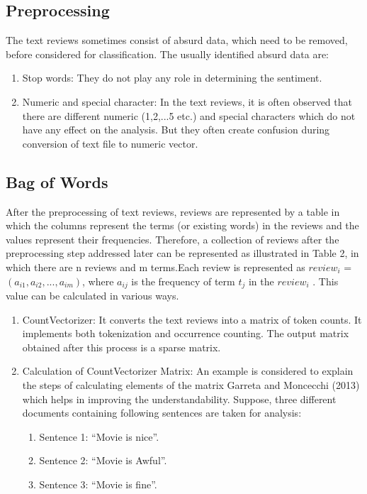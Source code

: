 \documentclass[10pt]{article}
\begin{document}
{\subsection{Preprocessing}
The text reviews sometimes consist of absurd data, which
need to be removed, before considered for classification.
The usually identified absurd data are:
\begin{enumerate}
 \item Stop words: They do not play any role in determining
the sentiment.
  \item Numeric and special character: In the text reviews, it is
often observed that there are different numeric (1,2,...5
etc.) and special characters %
which do not have any effect on the analysis. But they
often create confusion during conversion of text file to
numeric vector.
\end{enumerate}

\subsection{Bag of Words}
After the preprocessing of text reviews, reviews are represented by a table in which the columns
represent the terms (or existing words) in the reviews and the values
represent their frequencies. Therefore, a collection of reviews after
the preprocessing step addressed later can be represented as illustrated in 
Table 2, in which there are n reviews and m terms.Each
review is represented as $review_i$ = $(a_{i1} , a_{i2} ,...,a_{im} )$, where $a_{ij}$ is the 
frequency of term $t_j$ in the $review_i$ . This value can be calculated in various
ways.
\begin{enumerate}
 \item CountVectorizer: It converts the text reviews into a matrix of token counts. It implements both tokenization
and occurrence counting. The output matrix obtained
after this process is a sparse matrix.
  \item Calculation of CountVectorizer Matrix: An example 
  is considered to explain the steps of calculating 
elements of the matrix Garreta and Moncecchi
(2013) which helps in improving the understandability. 
Suppose, three different documents 
containing following sentences are taken for analysis:
\begin{enumerate}
 \item Sentence 1: ``Movie is nice''.
 \item Sentence 2: ``Movie is Awful''.
 \item Sentence 3: ``Movie is fine''.
\end{enumerate}


\end{enumerate}}
\end{document}
